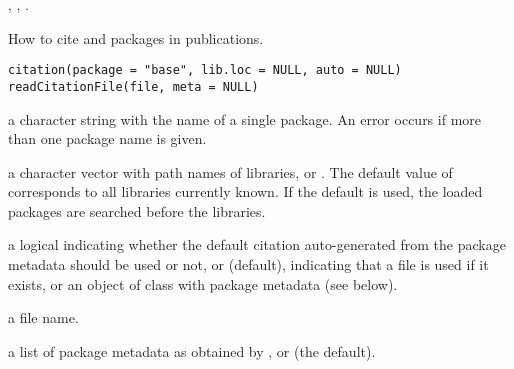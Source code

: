 %
\begin{SeeAlso}\relax
{}, ,
.
\end{SeeAlso}
%
\begin{Description}\relax
How to cite \R{} and \R{} packages in publications.
\end{Description}
%
\begin{Usage}
\begin{verbatim}
citation(package = "base", lib.loc = NULL, auto = NULL)
readCitationFile(file, meta = NULL)
\end{verbatim}
\end{Usage}
%
\begin{Arguments}
\begin{ldescription}
\item[\code{package}] a character string with the name of a single package.
An error occurs if more than one package name is given.
\item[\code{lib.loc}] a character vector with path names of \R{} libraries, or
.  The default value of  corresponds to all
libraries currently known.  If the default is used, the loaded
packages are searched before the libraries.
\item[\code{auto}] a logical indicating whether the default citation
auto-generated from the package  metadata should
be used or not, or  (default), indicating that a
 file is used if it exists, or an object of class
 with package metadata (see
below).
\item[\code{file}] a file name.
\item[\code{meta}] a list of package metadata as obtained by
, or  (the default).
\end{ldescription}
\end{Arguments}
%
